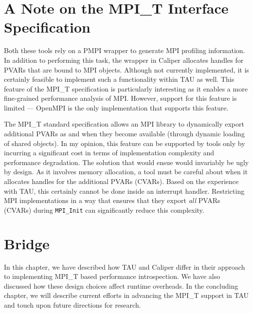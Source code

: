 \section{A Note on the MPI\_T Interface Specification}
\par Both these tools rely on a PMPI wrapper to generate MPI profiling information. In addition to performing this task, the wrapper in Caliper allocates handles for PVARs that are bound to MPI objects. Although not currently implemented, it is certainly feasible to implement such a functionality within TAU as well. This feature of the MPI\_T specification is particularly interesting as it enables a more fine-grained performance analysis of MPI. However, support for this feature is limited --- OpenMPI is the only implementation that supports this feature. 
\par The MPI\_T standard specification allows an MPI library to dynamically export additional PVARs as and when they become available (through dynamic loading of shared objects). In my opinion, this feature can be supported by tools only by incurring a significant cost in terms of implementation complexity and performance degradation. The solution that would ensue would invariably be ugly by design. As it involves memory allocation, a tool must be careful about when it allocates handles for the additional PVARs (CVARs). Based on the experience with TAU, this certainly cannot be done inside an interrupt handler. Restricting MPI implementations in a way that ensures that they export \textit{all} PVARs (CVARs) during \verb+MPI_Init+ can significantly reduce this complexity. 
\section{Bridge}
In this chapter, we have described how TAU and Caliper differ in their approach to implementing MPI\_T based performance introspection. We have also discussed how these design choices affect runtime overheads. In the concluding chapter, we will describe current efforts in advancing the MPI\_T support in TAU and touch upon future directions for research.
